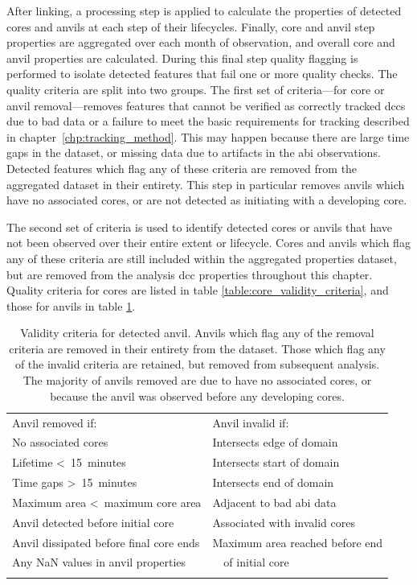 After linking, a processing step is applied to calculate the properties of detected cores and anvils at each step of their lifecycles.
Finally, core and anvil step properties are aggregated over each month of observation, and overall core and anvil properties are calculated.
During this final step quality flagging is performed to isolate detected features that fail one or more quality checks.
The quality criteria are split into two groups.
The first set of criteria---for core or anvil removal---removes features that cannot be verified as correctly tracked \acrshort{dcc}s due to bad data or a failure to meet the basic requirements for tracking described in chapter~\ref{chp:tracking_method}.
This may happen because there are large time gaps in the dataset, or missing data due to artifacts in the \acrshort{abi} observations.
Detected features which flag any of these criteria are removed from the aggregated dataset in their entirety.
This step in particular removes anvils which have no associated cores, or are not detected as initiating with a developing core.

The second set of criteria is used to identify detected cores or anvils that have not been observed over their entire extent or lifecycle.
Cores and anvils which flag any of these criteria are still included within the aggregated properties dataset, but are removed from the analysis \acrshort{dcc} properties throughout this chapter.
Quality criteria for cores are listed in table \ref{table:core_validity_criteria}, and those for anvils in table \ref{table:anvil_validity_criteria}.


\begin{table}[tb]
\centering
\begin{tabular}{ll}
\tophline
Anvil removed if:                               & Anvil invalid if: \\
\middlehline
No associated cores                             & Intersects edge of domain \\
Lifetime \textless~15~minutes                   & Intersects start of domain \\             
Time gaps \textgreater~15~minutes               & Intersects end of domain \\
Maximum area \textless~maximum core area        & Adjacent to bad \acrshort{abi} data \\
Anvil detected before initial core              & Associated with invalid cores \\
Anvil dissipated before final core ends         & Maximum area reached before end \\
Any NaN values in anvil properties              & ~~of initial core \\
\bottomhline
\end{tabular}
\caption[
Validity criteria for detected anvils
]{
Validity criteria for detected anvil. Anvils which flag any of the removal criteria are removed in their entirety from the dataset. Those which flag any of the invalid criteria are retained, but removed from subsequent analysis. The majority of anvils removed are due to have no associated cores, or because the anvil was observed before any developing cores.}
\label{table:anvil_validity_criteria}
\end{table}


